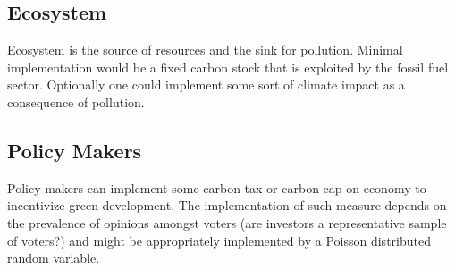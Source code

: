 \subsection{Ecosystem}
Ecosystem is the source of resources and the sink for pollution. Minimal implementation would be a fixed carbon stock that is exploited by the fossil fuel sector. Optionally one could implement some sort of climate impact as a consequence of pollution.

\subsection{Policy Makers}
Policy makers can implement some carbon tax or carbon cap on economy to incentivize green development. The implementation of such measure depends on the prevalence of opinions amongst voters (are investors a representative sample of voters?) and might be appropriately implemented by a Poisson distributed random variable.

{}
    
